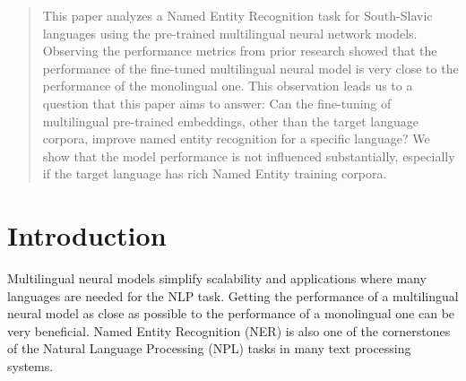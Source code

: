 \documentclass[sigconf]{acmart}
\begin{document}
\renewcommand{\shortauthors}{Ivačič et al.}

\begin{abstract}
  This paper analyzes a Named Entity Recognition task for South-Slavic languages using the pre-trained multilingual neural network models.
  Observing the performance metrics from prior research showed that the performance of the fine-tuned multilingual neural model is very close to the performance of the monolingual one.
  This observation leads us to a question that this paper aims to answer: Can the fine-tuning of multilingual pre-trained embeddings, other than the target language corpora, improve named entity recognition for a specific language?
  We show that the model performance is not influenced substantially, especially if the target language has rich Named Entity training corpora.
\end{abstract}



\maketitle

\section{Introduction}
\label{sec:introduction}
Multilingual neural models simplify scalability and applications where many languages are needed for the NLP task.
Getting the performance of a multilingual neural model as close as possible to the performance of a monolingual one can be very beneficial.
Named Entity Recognition (NER) is also one of the cornerstones of the Natural Language Processing (NPL) tasks in many text processing systems.
\end{document}
